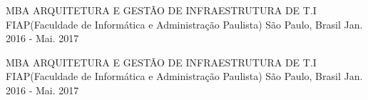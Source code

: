 

\begin{cventries}

  \cventry
    {MBA ARQUITETURA E GESTÃO DE INFRAESTRUTURA DE T.I} %
    {FIAP(Faculdade de Informática e Administração Paulista)} %
    {São Paulo, Brasil} %
    {Jan. 2016 - Mai. 2017} %

    {MBA ARQUITETURA E GESTÃO DE INFRAESTRUTURA DE T.I} %
    {FIAP(Faculdade de Informática e Administração Paulista)} %
    {São Paulo, Brasil} %
    {Jan. 2016 - Mai. 2017} %

\end{cventries}
